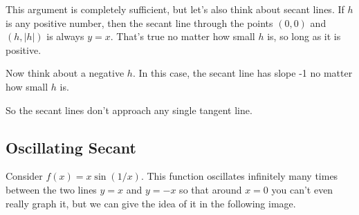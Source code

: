 \documentclass[11pt]{book}
\numberwithin{example}{chapter}
\begin{document}
This argument is completely sufficient, but let's also think about secant lines.  If $h$ is any positive number, then the secant line through the points $(0,0)$ and $(h,|h|)$ is always $y=x$.  That's true no matter how small $h$ is, so long as it is positive. 


\begin{center}
\end{center}


Now think about a negative $h$.  In this case, the secant line has slope -1 no matter how small $h$ is.



\begin{center}
\end{center}
So the secant lines don't approach any single tangent line.  

\subsection{Oscillating Secant}


Consider $f(x)=x\sin(1/x)$.  This function oscillates infinitely many times between the two lines $y=x$ and $y=-x$ so that around $x=0$ you can't even really graph it, but we can give the idea of it in the following image.
\end{document}
